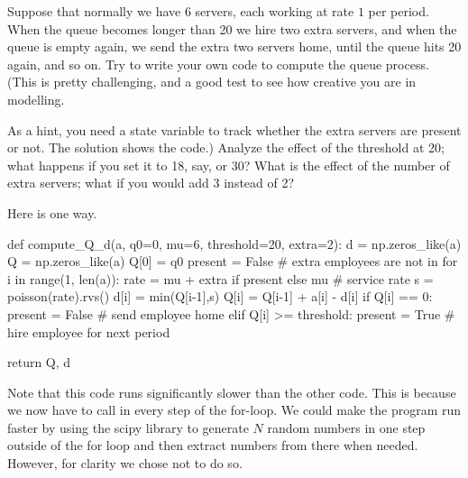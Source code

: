 \documentclass{scrartcl}
\begin{document}
\begin{exercise}
  Suppose that normally we have 6 servers, each working at rate $1$ per period. When the queue becomes longer than 20 we hire two extra servers, and when the queue is empty again, we send the extra two servers home, until the queue hits 20 again, and so on. Try to write your own code to compute the queue process. (This is pretty challenging, and a good test to see how creative you are in modelling.
  \hintsymbol\begin{hint}
  As a hint, you need a state variable to track whether the extra servers are present or not. The solution shows the code.) Analyze the effect of the threshold at 20; what happens if you set it to 18, say, or 30? What is the effect of the number of extra servers; what if you would add 3 instead of 2?
  \end{hint}

  \begin{solution}
Here is one way.
    \begin{pyverbatim}
def compute_Q_d(a, q0=0, mu=6, threshold=20, extra=2):
    d = np.zeros_like(a)
    Q = np.zeros_like(a)
    Q[0] = q0
    present = False # extra employees are not in
    for i in range(1, len(a)):
        rate = mu + extra if present else mu # service rate
        s = poisson(rate).rvs()
        d[i] = min(Q[i-1],s)
        Q[i] = Q[i-1] + a[i] - d[i]
        if Q[i] == 0:
            present = False # send employee home
        elif Q[i] >= threshold:
            present = True # hire employee for next period
    
    return Q, d
    
    \end{pyverbatim}


    Note that this code runs significantly  slower than the other code. This is because  we now  have to call  in every step of the for-loop. We could make the program run faster by using the scipy library to generate $N$ random numbers in one step outside of the for loop and then extract numbers from there when needed. However, for clarity we chose not to do so.
  \end{solution}
  
\end{exercise}
\end{document}
